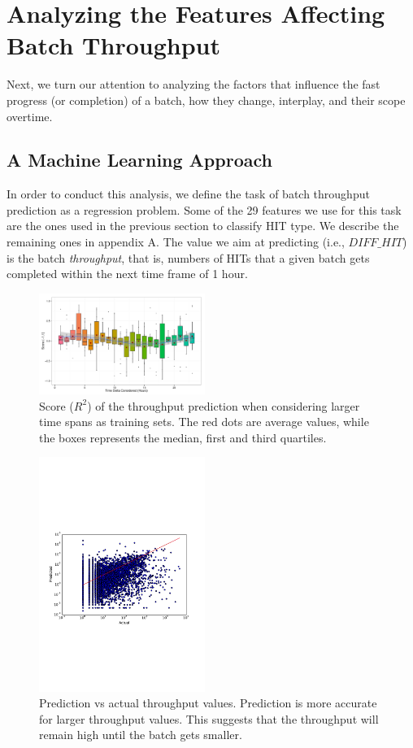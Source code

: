 \section{Analyzing the Features Affecting Batch Throughput}
\label{sec:throughput}
Next, we turn our attention to analyzing the factors that influence the fast progress (or completion) of a batch, how they change, interplay, and their scope overtime.
\subsection{A Machine Learning Approach}
In order to conduct this analysis, we define the task of batch throughput prediction as a regression problem.  Some of the  29  features we use for this task are the ones used in the previous section to classify HIT type.  We describe the remaining ones in appendix A. The value  we aim at predicting (i.e.,   $DIFF\_HIT$) is the batch \emph{throughput}, that is, numbers of HITs that  a given batch gets completed within the next time frame of 1 hour.

\begin{figure}[tb]
	\centering
		\includegraphics[width=0.48\textwidth]{figures/ML_accuracy}
	\caption{Score ($R^2$) of the throughput prediction when considering larger time spans as training sets. The red dots are average values, while the boxes represents the median, first and third quartiles.}
	\label{fig:accuracy}
\end{figure}

\begin{figure}[tb]
	\centering
		\includegraphics[width=0.48\textwidth]{figures/predictions_3}
	\caption{Prediction vs actual throughput values. Prediction is more accurate for larger throughput values. This suggests that the throughput will remain high until the batch gets smaller.}
	\label{fig:pred}
\end{figure}

